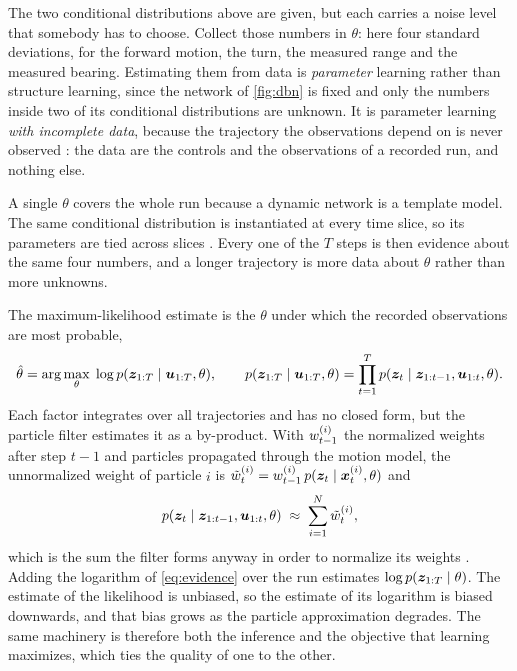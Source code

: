 The two conditional distributions above are given, but each carries a noise level that somebody has to choose.
Collect those numbers in $\theta$: here four standard deviations, for the forward motion, the turn, the measured
range and the measured bearing. Estimating them from data is \emph{parameter} learning rather than structure
learning, since the network of \cref{fig:dbn} is fixed and only the numbers inside two of its conditional
distributions are unknown. It is parameter learning \emph{with incomplete data}, because the trajectory the
observations depend on is never observed \cite[ch.~19]{koller2009probabilistic}: the data are the controls and the
observations of a recorded run, and nothing else.

A single $\theta$ covers the whole run because a dynamic network is a template model. The same conditional
distribution is instantiated at every time slice, so its parameters are tied across slices
\cite[ch.~6]{koller2009probabilistic}. Every one of the $T$ steps is then evidence about the same four numbers,
and a longer trajectory is more data about $\theta$ rather than more unknowns.

The maximum-likelihood estimate is the $\theta$ under which the recorded observations are most probable,
\begin{equation}
  \hat{\theta} = \arg\max_{\theta}\; \log p(\bm{z}_{1:T} \mid \bm{u}_{1:T}, \theta), \qquad
  p(\bm{z}_{1:T} \mid \bm{u}_{1:T}, \theta) = \prod_{t=1}^{T} p(\bm{z}_t \mid \bm{z}_{1:t-1}, \bm{u}_{1:t}, \theta).
  \label{eq:mle}
\end{equation}
Each factor integrates over all trajectories and has no closed form, but the particle filter estimates it as a
by-product. With $w_{t-1}^{(i)}$ the normalized weights after step $t-1$ and particles propagated through the
motion model, the unnormalized weight of particle $i$ is
$\tilde{w}_t^{(i)} = w_{t-1}^{(i)}\, p(\bm{z}_t \mid \bm{x}_t^{(i)}, \theta)$ and
\begin{equation}
  p(\bm{z}_t \mid \bm{z}_{1:t-1}, \bm{u}_{1:t}, \theta) \;\approx\; \sum_{i=1}^{N} \tilde{w}_t^{(i)},
  \label{eq:evidence}
\end{equation}
which is the sum the filter forms anyway in order to normalize its weights \cite{doucet2011tutorial}. Adding the
logarithm of \eqref{eq:evidence} over the run estimates $\log p(\bm{z}_{1:T} \mid \theta)$. The estimate of the
likelihood is unbiased, so the estimate of its logarithm is biased downwards, and that bias grows as the particle
approximation degrades. The same machinery is therefore both the inference and the objective that learning
maximizes, which ties the quality of one to the other.

